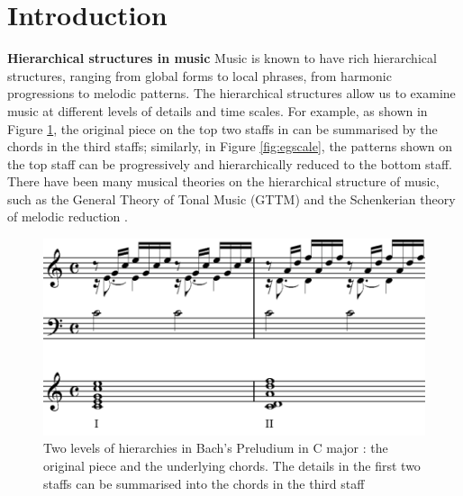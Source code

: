 \newcommand{\victor}[1]{{\color{blue}\textbf{[victor:}\textit{#1}\textbf{]}}}
\newcommand{\iris}[1]{{\color{purple}\textbf{[iris:}\textit{#1}\textbf{]}}}
\newcommand{\dimbc}{\mathrm{dim}^{\mathrm{BC}}}
\newcommand{\changed}[1]{{\color{ao(english)}{#1}}}

\section{Introduction}
\label{sec:intro}
\textbf{Hierarchical structures in music}
Music is known to have rich hierarchical structures, ranging from global forms to local phrases, from harmonic progressions to melodic patterns. 
The hierarchical structures allow us to examine music at different levels of details and time scales. 
For example, as shown in Figure \ref{fig:egbach}, the original piece on the top two staffs in can be summarised by the chords in the third staffs; 
similarly, in Figure \ref{fig:egscale}, the patterns shown on the top staff can be progressively and hierarchically reduced to the bottom staff. 
There have been many musical theories on the hierarchical structure of music, such as the General Theory of Tonal Music (GTTM) \cite{lerdahl1985generative} and the Schenkerian theory of melodic reduction \cite{forte1959schenker}.
\begin{figure}[!h]
  \includegraphics[width=\linewidth]{src/img/eg.png}
  \caption{Two levels of hierarchies in Bach's Preludium in C major \cite{wiki:bach}: the original piece and the underlying chords.
          The details in the first two staffs can be summarised into the chords in the third staff}
  \label{fig:egbach}
\end{figure}

